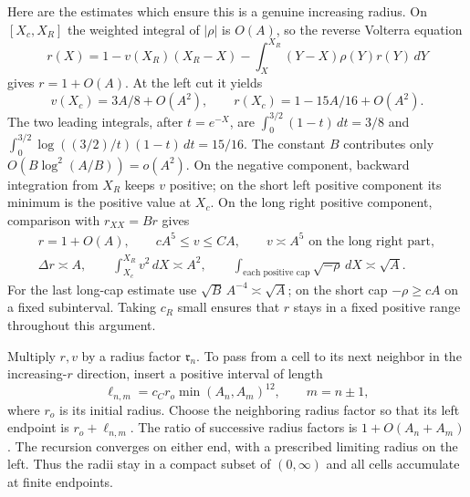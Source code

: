 Here are the estimates which ensure this is a genuine increasing
radius.  On $[X_c,X_R]$ the weighted integral of $|\rho|$ is $O(A)$,
so the reverse Volterra equation
\[
 r(X)=1-v(X_R)(X_R-X)
       -\int_X^{X_R}(Y-X)\rho(Y)r(Y)\,dY
\]
gives $r=1+O(A)$.  At the left cut it yields
\begin{equation}\label{eq:rad-eq-rm6a}
 v(X_c)=3A/8+O(A^2),\qquad
 r(X_c)=1-15A/16+O(A^2).
\end{equation}
The two leading integrals, after $t=e^{-X}$, are
$\int_0^{3/2}(1-t)\,dt=3/8$ and
$\int_0^{3/2}\log((3/2)/t)(1-t)\,dt=15/16$.
The constant $B$ contributes only $O(B\log^2(A/B))=o(A^2)$.
On the negative component, backward integration from $X_R$ keeps
$v$ positive; on the short left positive component its minimum is the
positive value at $X_c$.  On the long right positive component,
comparison with $r_{XX}=Br$ gives
\begin{equation}\label{eq:rad-eq-rm6}
 \begin{gathered}
 r=1+O(A),\qquad cA^5\le v\le CA,\qquad
 v\asymp A^5\text{ on the long right part},\\
 \Delta r\asymp A,\qquad
 \int_{X_c}^{X_R}v^2\,dX\asymp A^2,\qquad
 \int_{\text{each positive cap}}\sqrt{-\rho}\,dX\asymp\sqrt A.
 \end{gathered}
\end{equation}
For the last long-cap estimate use
$\sqrt B\,A^{-4}\asymp\sqrt A$; on the short cap
$-\rho\ge cA$ on a fixed subinterval.  Taking $c_R$ small ensures
that $r$ stays in a fixed positive range throughout this argument.

Multiply $r,v$ by a radius factor $\mathfrak r_n$.  To pass from a
cell to its next neighbor in the increasing-$r$ direction, insert a
positive interval of length
\begin{equation}\label{eq:rad-eq-rm7}
 \ell_{n,m}=c_Cr_o\min(A_n,A_m)^{12},\qquad m=n\pm1,
\end{equation}
where $r_o$ is its initial radius.  Choose the neighboring radius
factor so that its left endpoint is $r_o+\ell_{n,m}$.
The ratio of successive radius factors is $1+O(A_n+A_m)$.
The recursion converges on either end, with a prescribed limiting
radius on the left.  Thus the radii stay in a compact subset of
$(0,\infty)$ and all cells accumulate at finite endpoints.

